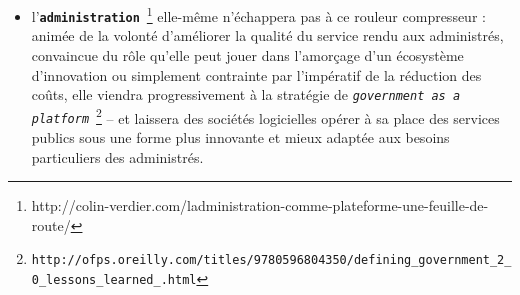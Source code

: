 \documentclass[11pt,twoside,a4paper]{article}
\begin{document}
\begin{itemize}
	\item l'\texttt{\textbf{administration}}~\footnote{http://colin-verdier.com/ladministration-comme-plateforme-une-feuille-de-route/} elle-m{\^e}me n'{\'e}chappera pas {\`a} ce rouleur compresseur : anim{\'e}e de la volont{\'e} d'am{\'e}liorer la qualit{\'e} du service rendu aux administr{\'e}s, convaincue du r{\^o}le qu'elle peut jouer dans l'amor\c{c}age d'un {\'e}cosyst{\`e}me d'innovation ou simplement contrainte par l'imp{\'e}ratif de la r{\'e}duction des co{\^u}ts, elle viendra progressivement {\`a} la strat{\'e}gie de \texttt{\emph{government as a platform}}~\footnote{\texttt{http://ofps.oreilly.com/titles/9780596804350/defining\_government\_2\_0\_lessons\_learned\_.html}} -- et laissera des soci{\'e}t{\'e}s logicielles op{\'e}rer {\`a} sa place des services publics sous une forme plus innovante et mieux adapt{\'e}e aux besoins particuliers des administr{\'e}s.
\end{itemize} %
\setlength\parindent{0pt}
\end{document}
